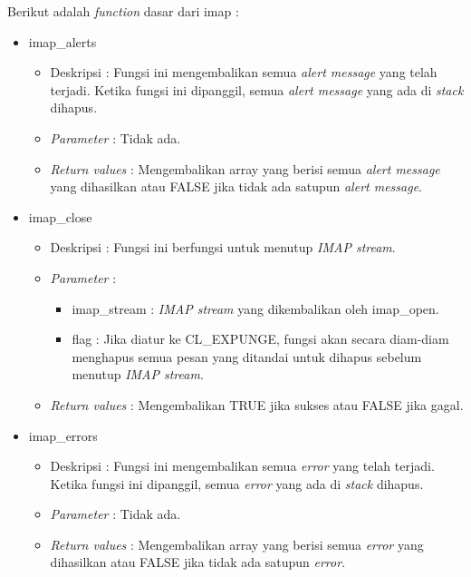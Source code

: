Berikut adalah \textit{function} dasar dari imap :
\begin{itemize}
\item imap\_alerts
\begin{itemize}
\item Deskripsi : Fungsi ini mengembalikan semua \textit{alert message} yang telah terjadi. Ketika fungsi ini dipanggil, semua \textit{alert message} yang ada di \textit{stack} dihapus.
\item \textit{Parameter} : Tidak ada.
\item \textit{Return values} : Mengembalikan array yang berisi semua \textit{alert message} yang dihasilkan atau FALSE jika tidak ada satupun \textit{alert message}.
\end{itemize}
 
\item imap\_close
\begin{itemize}
\item Deskripsi : Fungsi ini berfungsi untuk menutup \textit{IMAP stream}.
\item \textit{Parameter} :
\begin{itemize}
\item imap\_stream : \textit{IMAP stream} yang dikembalikan oleh imap\_open.
\item flag : Jika diatur ke CL\_EXPUNGE, fungsi akan secara diam-diam menghapus semua pesan yang ditandai untuk dihapus sebelum menutup \textit{IMAP stream}.
\end{itemize}
\item \textit{Return values} : Mengembalikan TRUE jika sukses atau FALSE jika gagal.
\end{itemize}
 
\item imap\_errors
\begin{itemize}
\item Deskripsi : Fungsi ini mengembalikan semua \textit{error} yang telah terjadi. Ketika fungsi ini dipanggil, semua \textit{error} yang ada di \textit{stack} dihapus.
\item \textit{Parameter} : Tidak ada.
\item \textit{Return values} : Mengembalikan array yang berisi semua \textit{error} yang dihasilkan atau FALSE jika tidak ada satupun \textit{error}.
\end{itemize}
 

\end{itemize}

